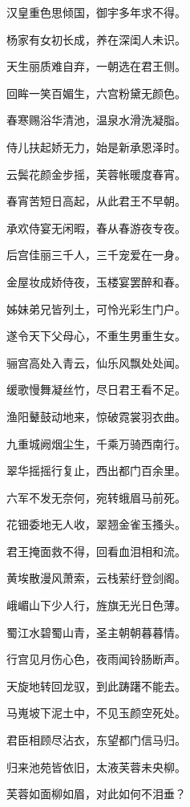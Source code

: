 \documentclass[12pt,UTF-8,openany,fontset=none]{ctexbook}
\begin{document}
\begin{center}
    \begin{Large}

        汉皇重色思倾国，御宇多年求不得。

        杨家有女初长成，养在深闺人未识。

        天生丽质难自弃，一朝选在君王侧。

        回眸一笑百媚生，六宫粉黛无颜色。

        春寒赐浴华清池，温泉水滑洗凝脂。

        侍儿扶起娇无力，始是新承恩泽时。

        云鬓花颜金步摇，芙蓉帐暖度春宵。

        春宵苦短日高起，从此君王不早朝。

        承欢侍宴无闲暇，春从春游夜专夜。

        后宫佳丽三千人，三千宠爱在一身。

        金屋妆成娇侍夜，玉楼宴罢醉和春。

        姊妹弟兄皆列土，可怜光彩生门户。

        遂令天下父母心，不重生男重生女。

        骊宫高处入青云，仙乐风飘处处闻。

        缓歌慢舞凝丝竹，尽日君王看不足。

        渔阳鼙鼓动地来，惊破霓裳羽衣曲。

        九重城阙烟尘生，千乘万骑西南行。

        翠华摇摇行复止，西出都门百余里。

        六军不发无奈何，宛转蛾眉马前死。

        花钿委地无人收，翠翘金雀玉搔头。

        君王掩面救不得，回看血泪相和流。

        黄埃散漫风萧索，云栈萦纡登剑阁。

        峨嵋山下少人行，旌旗无光日色薄。

        蜀江水碧蜀山青，圣主朝朝暮暮情。

        行宫见月伤心色，夜雨闻铃肠断声。

        天旋地转回龙驭，到此踌躇不能去。

        马嵬坡下泥土中，不见玉颜空死处。

        君臣相顾尽沾衣，东望都门信马归。

        归来池苑皆依旧，太液芙蓉未央柳。

        芙蓉如面柳如眉，对此如何不泪垂？


\end{Large}
\end{center}
\end{document}
